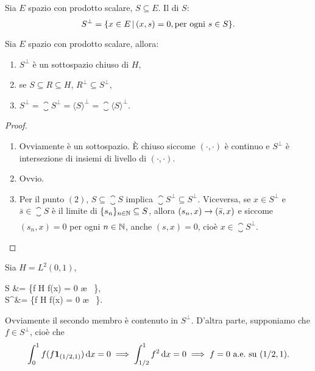 \begin{definition}
	Sia $E$ spazio con prodotto scalare, $S \subseteq E$. Il  di $S$:
	\begin{equation*}
		S^\perp = \{ x \in E \,|\, (x,s) = 0, \text{per ogni $s \in S$} \}.
	\end{equation*}
\end{definition}

\begin{lemma}
	Sia $E$ spazio con prodotto scalare, allora:
	\begin{enumerate}
		\item $S^\perp$ è un sottospazio chiuso di $H$,
		\item se $S \subseteq R \subseteq H$, $R^\perp \subseteq S^\perp$,
		\item $S^\perp = \closure{S}^\perp = \langle S \rangle ^\perp = \closure{\langle S \rangle}^\perp$.
	\end{enumerate}
\end{lemma}
\begin{proof}
	\leavevmode
	\begin{enumerate}
		\item Ovviamente è un sottospazio. È chiuso siccome $(\cdot, \cdot)$ è continuo e $S^\perp$ è intersezione di insiemi di livello di $(\cdot, \cdot)$.
		\item Ovvio.
		\item Per il punto $(2)$, $S \subseteq \closure S$ implica $\closure{S}^\perp \subseteq S^\perp$. Viceversa, se $x \in S^\perp$ e $\bar s \in \closure S$ è il limite di $\{s_n\}_{n \in \mathbb{N}} \subseteq S$, allora $(s_n, x) \underset{{}}{\rightarrow} (\bar s,x)$ e siccome $(s_n,x) = 0$ per ogni $n \in \mathbb{N}$, anche $(s,x) = 0$, cioè $x \in \closure S^\perp$.
	\end{enumerate}
\end{proof}

\begin{example}
	Sia $H = L^2(0,1)$,
	\begin{eqalign*}
		S &= \{f \in H \suchthat f(x) = 0 \ae\  \},\\
		S^\perp &= \{f \in H \suchthat f(x) = 0 \ae\  \}.
	\end{eqalign*}
	Ovviamente il secondo membro è contenuto in $S^\perp$. D'altra parte, supponiamo che $f \in S^\perp$, cioè che
	\begin{equation*}
		\int_0^1 f (f {\boldsymbol{1}}_{(1/2,1)})\,\mathrm{d}x = 0 \implies \int_{1/2}^1 f^2\,\mathrm{d}x = 0 \implies f = 0 \ \text{a.e.}\ \text{su $(1/2,1)$}.
	\end{equation*}
\end{example}

